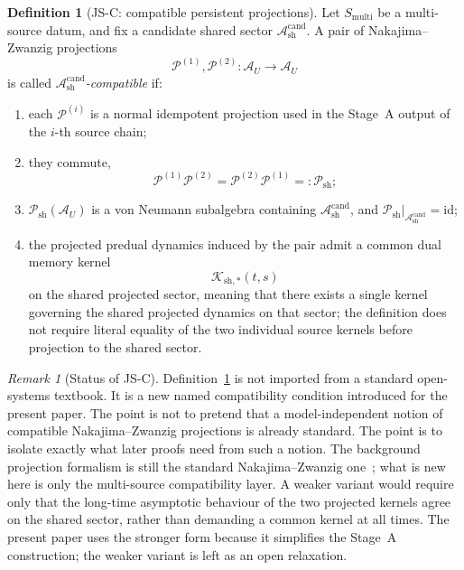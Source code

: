 \documentclass[12pt]{article}
\theoremstyle{definition}
\newtheorem{definition}[theorem]{Definition}
\theoremstyle{remark}
\newtheorem{remark}[theorem]{Remark}
\begin{document}
\begin{definition}[JS-C: compatible persistent projections]\label{def:JSC}
Let \(S_{\mathrm{multi}}\) be a multi-source datum, and fix a candidate
shared sector \(\mathcal A_{\mathrm{sh}}^{\mathrm{cand}}\). A pair of
Nakajima--Zwanzig projections
\[
\mathcal P^{(1)},\mathcal P^{(2)}:\mathcal A_U\to\mathcal A_U
\]
is called \emph{\(\mathcal A_{\mathrm{sh}}^{\mathrm{cand}}\)-compatible}
if:
\begin{enumerate}
\item each \(\mathcal P^{(i)}\) is a normal idempotent projection used
  in the Stage~A output of the \(i\)-th source chain;
\item they commute,
  \[
  \mathcal P^{(1)}\mathcal P^{(2)}
  =
  \mathcal P^{(2)}\mathcal P^{(1)}
  =:\mathcal P_{\mathrm{sh}};
  \]
\item \(\mathcal P_{\mathrm{sh}}(\mathcal A_U)\) is a von Neumann
  subalgebra containing
  \(\mathcal A_{\mathrm{sh}}^{\mathrm{cand}}\), and
  \(\mathcal P_{\mathrm{sh}}|_{\mathcal A_{\mathrm{sh}}^{\mathrm{cand}}}
  = \mathrm{id}\);
\item the projected predual dynamics induced by the pair admit a common
  dual memory kernel
  \[
  \mathcal K_{\mathrm{sh},*}(t,s)
  \]
  on the shared projected sector, meaning that there exists a single
  kernel governing the shared projected dynamics on that sector; the
  definition does not require literal equality of the two individual
  source kernels before projection to the shared sector.
\end{enumerate}
\end{definition}

\begin{remark}[Status of JS-C]
Definition~\ref{def:JSC} is not imported from a standard open-systems
textbook. It is a new named compatibility condition introduced for the
present paper. The point is not to pretend that a model-independent
notion of compatible Nakajima--Zwanzig projections is already standard.
The point is to isolate exactly what later proofs need from such a
notion. The background projection formalism is still the standard
Nakajima--Zwanzig one~\cite{Nakajima1958,Zwanzig1960}; what is new here
is only the multi-source compatibility layer. A weaker variant would
require only that the long-time asymptotic behaviour of the two
projected kernels agree on the shared sector, rather than demanding a
common kernel at all times. The present paper uses the stronger form
because it simplifies the Stage~A construction; the weaker variant is
left as an open relaxation.
\end{remark}
\end{document}

